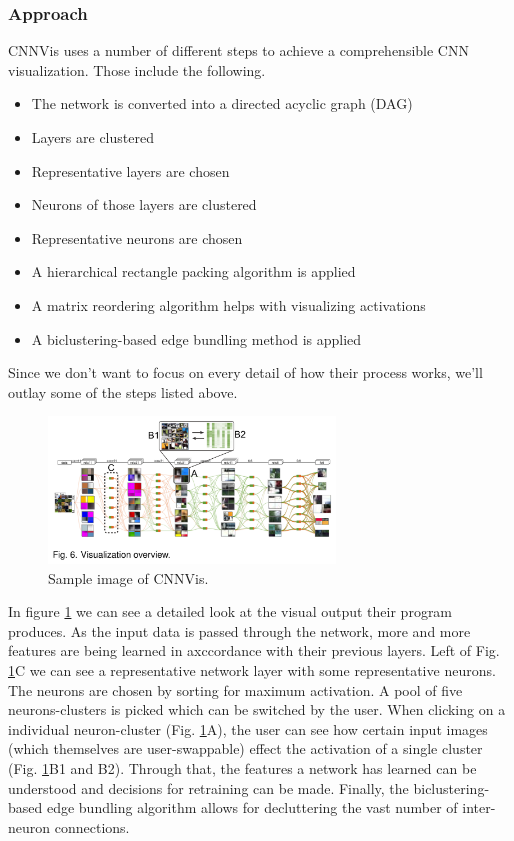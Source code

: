 \documentclass{acmsiggraph}               %
\begin{document}
\subsubsection{Approach}
CNNVis uses a number of different steps to achieve a comprehensible CNN visualization. Those include the following.

\begin{itemize}
  \item The network is converted into a directed acyclic graph (DAG)
  \item Layers are clustered
  \item Representative layers are chosen
  \item Neurons of those layers are clustered
  \item Representative neurons are chosen
  \item A hierarchical rectangle packing algorithm is applied
  \item A matrix reordering algorithm helps with visualizing activations
  \item A biclustering-based edge bundling method is applied
\end{itemize}

Since we don't want to focus on every detail of how their process works, we'll outlay some of the steps listed above.\\

\begin{figure}
  \centering
  \includegraphics[width=3in]{cnnvis_detail}
  \caption{Sample image of CNNVis. \protect\cite{}}
  \label{fig:cnnvis_detail}
\end{figure}

In figure \ref{fig:cnnvis_detail} we can see a detailed look at the visual output their program produces. As the input data is passed through the network, more and more features are being learned in axccordance with their previous layers. Left of Fig. \ref{fig:cnnvis_detail}C we can see a representative network layer with some representative neurons. The neurons are chosen by sorting for maximum activation. A pool of five neurons-clusters is picked which can be switched by the user. When clicking on a individual neuron-cluster (Fig. \ref{fig:cnnvis_detail}A), the user can see how certain input images (which themselves are user-swappable) effect the activation of a single cluster (Fig. \ref{fig:cnnvis_detail}B1 and B2). Through that, the features a network has learned can be understood and decisions for retraining can be made. Finally, the biclustering-based edge bundling algorithm allows for decluttering the vast number of inter-neuron connections.\\
\end{document}
